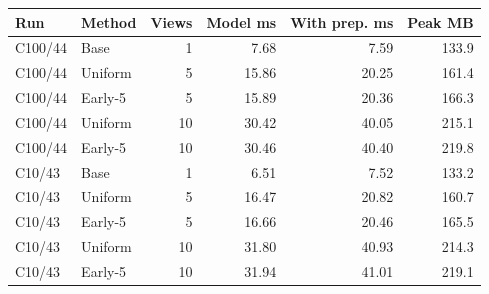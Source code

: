 \begin{tabular}{llrrrr}
\toprule
Run & Method & Views & Model ms & With prep. ms & Peak MB \\
\midrule
C100/44 & Base & 1 & 7.68 & 7.59 & 133.9 \\
C100/44 & Uniform & 5 & 15.86 & 20.25 & 161.4 \\
C100/44 & Early-5 & 5 & 15.89 & 20.36 & 166.3 \\
C100/44 & Uniform & 10 & 30.42 & 40.05 & 215.1 \\
C100/44 & Early-5 & 10 & 30.46 & 40.40 & 219.8 \\
C10/43 & Base & 1 & 6.51 & 7.52 & 133.2 \\
C10/43 & Uniform & 5 & 16.47 & 20.82 & 160.7 \\
C10/43 & Early-5 & 5 & 16.66 & 20.46 & 165.5 \\
C10/43 & Uniform & 10 & 31.80 & 40.93 & 214.3 \\
C10/43 & Early-5 & 10 & 31.94 & 41.01 & 219.1 \\
\bottomrule
\end{tabular}
